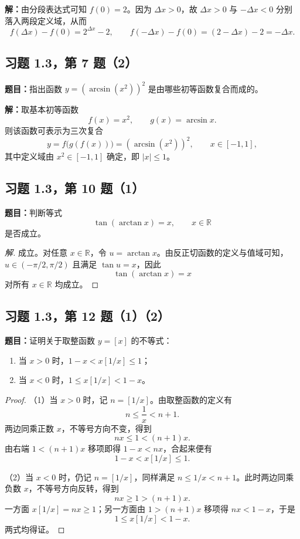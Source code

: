 \documentclass[UTF8, fontset=fandol, a4paper, 12pt]{ctexart}
\newcommand{\R}{\mathbb R}
\theoremstyle{definition}
\begin{document}
\noindent\textbf{解：}由分段表达式可知 $f(0)=2$。因为 $\Delta x>0$，故 $\Delta x>0$ 与 $-\Delta x<0$ 分别落入两段定义域，从而
\[
 f(\Delta x)-f(0)=2^{\Delta x}-2,
 \qquad
 f(-\Delta x)-f(0)=(2-\Delta x)-2=-\Delta x.
\]

\subsection{习题 1.3，第 7 题（2）}
\noindent\textbf{题目：}指出函数 $y=(\arcsin(x^2))^2$ 是由哪些初等函数复合而成的。

\noindent\textbf{解：}取基本初等函数
\[
 f(x)=x^2,\qquad g(x)=\arcsin x.
\]
则该函数可表示为三次复合
\[
 y=f\bigl(g(f(x))\bigr)=(\arcsin(x^2))^2,
 \qquad x\in[-1,1],
\]
其中定义域由 $x^2\in[-1,1]$ 确定，即 $|x|\le1$。

\subsection{习题 1.3，第 10 题（1）}
\noindent\textbf{题目：}判断等式
\[
 \tan(\arctan x)=x,\qquad x\in\R
\]
是否成立。

\begin{proof}[解]
成立。对任意 $x\in\R$，令 $u=\arctan x$。由反正切函数的定义与值域可知，$u\in(-\pi/2,\pi/2)$ 且满足 $\tan u=x$，因此
\[
 \tan(\arctan x)=x
\]
对所有 $x\in\R$ 均成立。
\end{proof}

\subsection{习题 1.3，第 12 题（1）（2）}
\noindent\textbf{题目：}证明关于取整函数 $y=[x]$ 的不等式：
\begin{enumerate}[label=(\arabic*)]
 \item 当 $x>0$ 时，$1-x<x[1/x]\le1$；
 \item 当 $x<0$ 时，$1\le x[1/x]<1-x$。
\end{enumerate}

\begin{proof}
（1）当 $x>0$ 时，记 $n=[1/x]$。由取整函数的定义有
\[
 n\le\frac1x<n+1.
\]
两边同乘正数 $x$，不等号方向不变，得到
\[
 nx\le1<(n+1)x.
\]
由右端 $1<(n+1)x$ 移项即得 $1-x<nx$，合起来便有
\[
 1-x<x[1/x]\le1.
\]

（2）当 $x<0$ 时，仍记 $n=[1/x]$，同样满足 $n\le1/x<n+1$。此时两边同乘负数 $x$，不等号方向反转，得到
\[
 nx\ge1>(n+1)x.
\]
一方面 $x[1/x]=nx\ge1$；另一方面由 $1>(n+1)x$ 移项得 $nx<1-x$，于是
\[
 1\le x[1/x]<1-x.
\]
两式均得证。
\end{proof}
\end{document}
